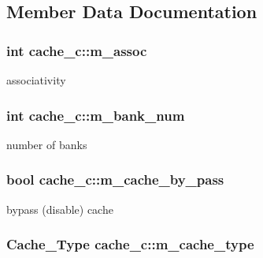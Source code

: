 \subsection{Member Data Documentation}
\hypertarget{classcache__c_a1baa2f851f435fb5ecd11ead4f3dcc66}{
\subsubsection[{m\_\-assoc}]{\setlength{\rightskip}{0pt plus 5cm}int {\bf cache\_\-c::m\_\-assoc}}}
\label{classcache__c_a1baa2f851f435fb5ecd11ead4f3dcc66}
associativity \hypertarget{classcache__c_ae0502cb5fca2335260f87efd662a053b}{
\subsubsection[{m\_\-bank\_\-num}]{\setlength{\rightskip}{0pt plus 5cm}int {\bf cache\_\-c::m\_\-bank\_\-num}}}
\label{classcache__c_ae0502cb5fca2335260f87efd662a053b}
number of banks \hypertarget{classcache__c_ab61f6ec8dca440cb2159d6268f1c2be7}{
\subsubsection[{m\_\-cache\_\-by\_\-pass}]{\setlength{\rightskip}{0pt plus 5cm}bool {\bf cache\_\-c::m\_\-cache\_\-by\_\-pass}}}
\label{classcache__c_ab61f6ec8dca440cb2159d6268f1c2be7}
bypass (disable) cache \hypertarget{classcache__c_a5d3a5366674d862f4818e2980af21b50}{
\subsubsection[{m\_\-cache\_\-type}]{\setlength{\rightskip}{0pt plus 5cm}Cache\_\-Type {\bf cache\_\-c::m\_\-cache\_\-type}}}
